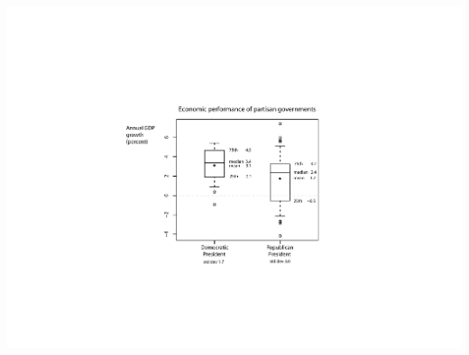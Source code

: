 \documentclass[pdflatex,landscape,titlepage]{foils}
\begin{document}
\begin{center}
\color{black}
\includegraphics[width=9 in]{gdpbox2}
\color{white}
\end{center}
\end{document}
